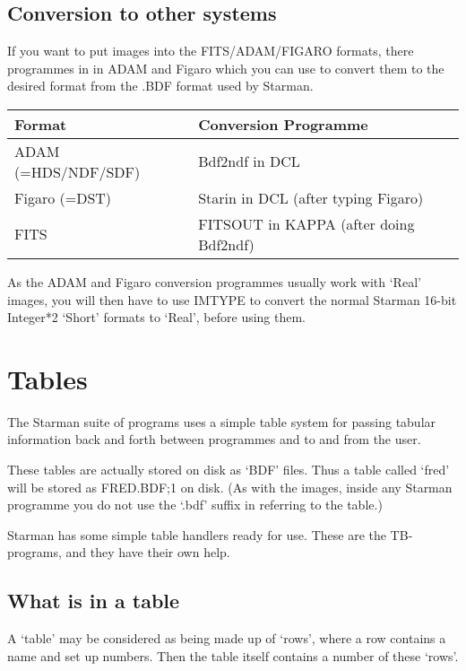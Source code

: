 \subsection{Conversion to other systems}

If you want to put images into the FITS/ADAM/FIGARO formats, there 
programmes in in ADAM and Figaro which you can use to convert them to 
the desired format from the .BDF format used by Starman. 

\hspace{4ex} \begin{tabular}[c]{|l|l|} \hline
   Format              &   Conversion Programme \\ \hline
   ADAM (=HDS/NDF/SDF) &   Bdf2ndf in DCL \\
   Figaro (=DST)       &   Starin in DCL (after typing Figaro) \\
   FITS                &   FITSOUT in KAPPA (after doing Bdf2ndf) \\ \hline
\end{tabular}

As the ADAM and Figaro conversion programmes usually work with `Real'
images, you will then have to use IMTYPE to convert the normal Starman
16-bit Integer*2 `Short' formats to `Real', before using them.

\section{Tables}

The Starman suite of programs uses a simple table system for passing
tabular information back and forth between programmes and to and
from the user.

These tables are actually stored on disk as `BDF' files. Thus a 
table called `fred' will be stored as FRED.BDF;1 on disk.
(As with the images, inside any Starman programme you do not
use the `.bdf' suffix in referring to the table.)

Starman has some simple table handlers ready for use. These are the 
TB-programs, and they have their own help.

\subsection{What is in a table}

A `table' may be considered as being made up of `rows', where a 
row contains a name and set up numbers. Then the table itself
contains a number of these `rows'.

